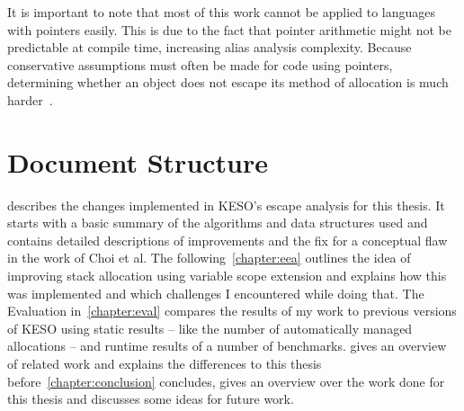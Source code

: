 		It is important to note that most of this work cannot be applied to languages with pointers easily. This is due to
		the fact that pointer arithmetic might not be predictable at compile time, increasing alias analysis complexity.
		Because conservative assumptions must often be made for code using pointers, determining whether an object does not
		escape its method of allocation is much harder~\cite{horwitz:97:toplas, hind:99:toplas, landi:92:loplas,
		ramalingam:94:toplas}.

	\section{Document Structure}
		\label{sec:intro:document-structure}
		 describes the changes implemented in KESO's escape analysis for this thesis. It starts with
		a basic summary of the algorithms and data structures used and contains detailed descriptions of improvements and
		the fix for a conceptual flaw in the work of Choi et al. The following~\cref{chapter:eea} outlines the idea of
		improving stack allocation using variable scope extension and explains how this was implemented and which challenges
		I encountered while doing that. The Evaluation in~\cref{chapter:eval} compares the results of my work to previous
		versions of KESO using static results – like the number of automatically managed allocations – and runtime results
		of a number of benchmarks.  gives an overview of related work and explains the differences to this
		thesis before~\cref{chapter:conclusion} concludes, gives an overview over the work done for this thesis and
		discusses some ideas for future work.
